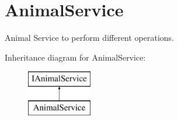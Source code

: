 \hypertarget{classWildLifeTracker_1_1Services_1_1AnimalService}{}\section{Animal\+Service}
\label{classWildLifeTracker_1_1Services_1_1AnimalService}


Animal Service to perform different operations.  


Inheritance diagram for Animal\+Service\+:\begin{figure}[H]
\begin{center}
\leavevmode
\includegraphics[height=2.000000cm]{classWildLifeTracker_1_1Services_1_1AnimalService}
\end{center}
\end{figure}
